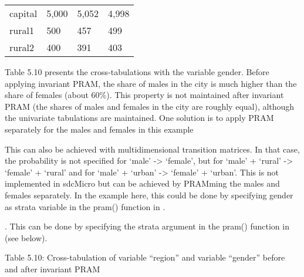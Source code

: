 \documentclass[letterpaper,10pt,english]{sphinxmanual}
\begin{document}
\begin{savenotes}\sphinxattablestart
\centering
\begin{tabulary}{\linewidth}[t]{|T|T|T|T|}
\hline
\sphinxstyletheadfamily 
{}
&\sphinxstyletheadfamily 
{}
&\sphinxstyletheadfamily 
{}
&\sphinxstyletheadfamily 
{}
\\
\hline
capital
&
5,000
&
5,052
&
4,998
\\
\hline
rural1
&
500
&
457
&
499
\\
\hline
rural2
&
400
&
391
&
403
\\
\hline
\end{tabulary}
\par
\sphinxattableend\end{savenotes}

Table 5.10 presents the cross-tabulations with the variable gender.
Before applying invariant PRAM, the share of males in the city is much
higher than the share of females (about 60\%). This property is not
maintained after invariant PRAM (the shares of males and females in the
city are roughly equal), although the univariate tabulations are
maintained. One solution is to apply PRAM separately for the males and
females in this example %
\begin{footnote}[13]\sphinxAtStartFootnote
This can also be achieved with multidimensional transition matrices.
In that case, the probability is not specified for ‘male’ -\textgreater{}
‘female’, but for ‘male’ + ‘rural’ -\textgreater{} ‘female’ + ‘rural’ and for
‘male’ + ‘urban’ -\textgreater{} ‘female’ + ‘urban’. This is not implemented in
sdcMicro but can be achieved by PRAMming the males and females
separately. In the example here, this could be done by specifying
gender as strata variable in the pram() function in .
%
\end{footnote}. This can be done by
specifying the strata argument in the pram() function in  (see
below).

Table 5.10: Cross-tabulation of variable “region” and variable “gender”
before and after invariant PRAM
\end{document}
